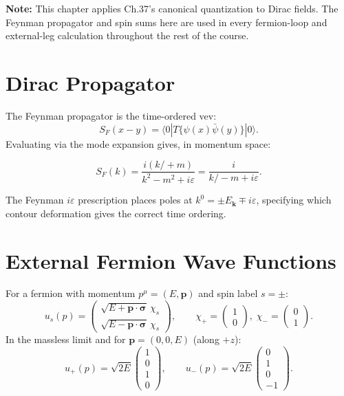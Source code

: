 \begin{mdframed}[backgroundcolor=blue!5]
\textbf{Note:} This chapter applies Ch.37's canonical quantization to Dirac
fields. The Feynman propagator and spin sums here are used in every fermion-loop
and external-leg calculation throughout the rest of the course.
\end{mdframed}

\section{Dirac Propagator}\label{sec:propagator}

The Feynman propagator is the time-ordered vev:
\begin{equation}
S_F(x-y) = \langle0| T\{\psi(x)\bar\psi(y)\}|0\rangle .
\end{equation}
Evaluating via the mode expansion gives, in momentum space:
\begin{mdframed}[backgroundcolor=green!5]
\begin{equation}
S_F(k) = \frac{i(k\!\!\!/+m)}{k^2-m^2+i\varepsilon}
      = \frac{i}{k\!\!\!/-m+i\varepsilon} .
\tag{39.3}
\end{equation}
\end{mdframed}

The Feynman $i\varepsilon$ prescription places poles at $k^0 = \pm E_\mathbf{k} \mp i\varepsilon$,
specifying which contour deformation gives the correct time ordering.

\section{External Fermion Wave Functions}\label{sec:external}

For a fermion with momentum $p^\mu=(E,\mathbf{p})$ and spin label $s=\pm$:
\begin{equation}
u_s(p) = \begin{pmatrix}
\sqrt{E+\mathbf{p}\cdot\boldsymbol{\sigma}}\,\chi_s \\
\sqrt{E-\mathbf{p}\cdot\boldsymbol{\sigma}}\,\chi_s
\end{pmatrix},
\qquad
\chi_+ = \begin{pmatrix}1\\0\end{pmatrix},\;
\chi_- = \begin{pmatrix}0\\1\end{pmatrix} .
\tag{39.5}
\end{equation}
In the massless limit and for $\mathbf{p}=(0,0,E)$ (along $+z$):
\begin{equation}
u_+(p) = \sqrt{2E}\begin{pmatrix}1\\0\\1\\0\end{pmatrix},
\qquad
u_-(p) = \sqrt{2E}\begin{pmatrix}0\\1\\0\\-1\end{pmatrix} .
\tag{39.6}
\end{equation}

